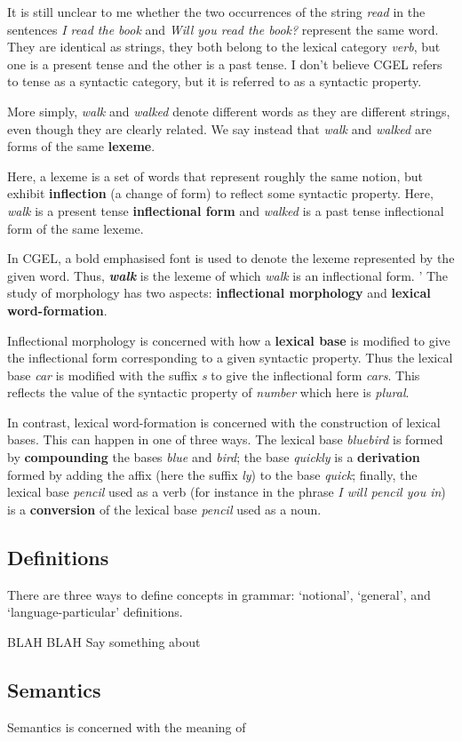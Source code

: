 \documentclass{scrarticle}
\begin{document}
It is still unclear to me whether the two occurrences of the string \emph{read} in the sentences
\emph{I read the book} and \emph{Will you read the book?} represent the same word. They are
identical as strings, they both belong to the lexical category \emph{verb}, but one is a present
tense and the other is a past tense. I don't believe CGEL refers to tense as a syntactic category,
but it is referred to as a syntactic property.

More simply, \emph{walk} and \emph{walked} denote different words as they are different strings,
even though they are clearly related. We say instead that \emph{walk} and \emph{walked} are forms of
the same \textbf{lexeme}.

Here, a lexeme is a set of words that represent roughly the same notion, but exhibit
\textbf{inflection} (a change of form) to reflect some syntactic property. Here, \emph{walk} is a
present tense \textbf{inflectional form} and \emph{walked} is a past tense inflectional form of the
same lexeme.

In CGEL, a bold emphasised font is used to denote the lexeme represented by the given word. Thus,
\textbf{\emph{walk}} is the lexeme of which \emph{walk} is an inflectional form. 
'
The study of morphology has two aspects: \textbf{inflectional morphology} and \textbf{lexical
word-formation}.

Inflectional morphology is concerned with how a \textbf{lexical base} is modified to give the
inflectional form corresponding to a given syntactic property. Thus the lexical base \emph{car} is
modified with the suffix \emph{\textperiodcentered s} to give the inflectional form \emph{cars}.
This reflects the value of the syntactic property of \emph{number} which here is \emph{plural}.

In contrast, lexical word-formation is concerned with the construction of lexical bases. This can
happen in one of three ways. The lexical base \emph{bluebird} is formed by \textbf{compounding} the
bases \emph{blue} and \emph{bird}; the base \emph{quickly} is a \textbf{derivation} formed by adding
the affix (here the suffix \emph{\textperiodcentered ly}) to the base \emph{quick}; finally, the
lexical base \emph{pencil} used as a verb (for instance in the phrase \emph{I will pencil you in})
is a \textbf{conversion} of the lexical base \emph{pencil} used as a noun.

\subsection{Definitions}

There are three ways to define concepts in grammar: `notional', `general', and `language-particular'
definitions. 

BLAH BLAH Say something about

\subsection{Semantics}

Semantics is concerned with the meaning of 
\end{document}
